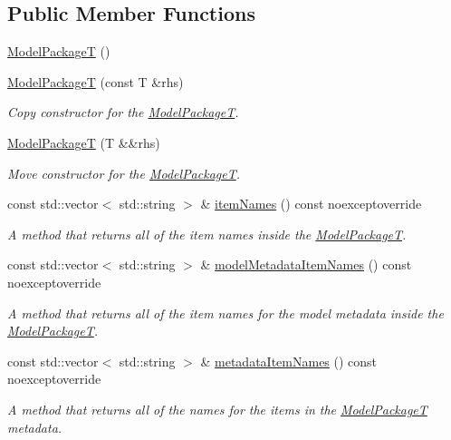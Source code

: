 \subsection*{Public Member Functions}
\begin{DoxyCompactItemize}
\item 
\hyperlink{classdg_1_1deepcore_1_1classification_1_1_model_package_t_ab0fb7729dac35419dce66261c15ff60c}{Model\+PackageT} ()
\item 
\hyperlink{group___classification_module_ga7ea483bc134d550711472d177240637f}{Model\+PackageT} (const T \&rhs)
\begin{DoxyCompactList}\small\item\em Copy constructor for the \hyperlink{classdg_1_1deepcore_1_1classification_1_1_model_package_t}{Model\+PackageT}. \end{DoxyCompactList}\item 
\hyperlink{group___classification_module_gae62b39fccdfbce7d738a502ea34a6b4d}{Model\+PackageT} (T \&\&rhs)
\begin{DoxyCompactList}\small\item\em Move constructor for the \hyperlink{classdg_1_1deepcore_1_1classification_1_1_model_package_t}{Model\+PackageT}. \end{DoxyCompactList}\item 
const std\+::vector$<$ std\+::string $>$ \& \hyperlink{group___classification_module_ga70d0c57bcb0d88c44be41e2591e42518}{item\+Names} () const noexceptoverride
\begin{DoxyCompactList}\small\item\em A method that returns all of the item names inside the \hyperlink{classdg_1_1deepcore_1_1classification_1_1_model_package_t}{Model\+PackageT}. \end{DoxyCompactList}\item 
const std\+::vector$<$ std\+::string $>$ \& \hyperlink{group___classification_module_ga6a84bb23e9720db751a63cc071ec15ab}{model\+Metadata\+Item\+Names} () const noexceptoverride
\begin{DoxyCompactList}\small\item\em A method that returns all of the item names for the model metadata inside the \hyperlink{classdg_1_1deepcore_1_1classification_1_1_model_package_t}{Model\+PackageT}. \end{DoxyCompactList}\item 
const std\+::vector$<$ std\+::string $>$ \& \hyperlink{group___classification_module_gae205ffc25753f735f7e0d0fa64cd4162}{metadata\+Item\+Names} () const noexceptoverride
\begin{DoxyCompactList}\small\item\em A method that returns all of the names for the items in the \hyperlink{classdg_1_1deepcore_1_1classification_1_1_model_package_t}{Model\+PackageT} metadata. \end{DoxyCompactList}\end{DoxyCompactItemize}
